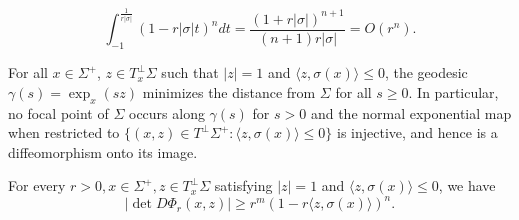 \documentclass[10pt,a4paper]{amsart}
\begin{document}
\begin{equation}\label{ineq I+4}
\int_{-1}^{\frac{1}{r|\sigma|}}(1-r|\sigma| t)^n d t=
\frac{(1+r|\sigma|)^{n+1}}{(n+1) r|\sigma|}=O(r^n).
\end{equation}

\begin{lemma}\label{lem no focal}
For all $x \in \Sigma^+$, $z \in {T}_x^{\perp} \Sigma$ such that $|z|=1$ and $\langle z, \sigma(x)\rangle \le 0$,
the geodesic $\gamma(s)=\exp_x\left(sz\right)$ minimizes the distance from $\Sigma$ for all $s \ge0$. In particular, no focal point of $\Sigma$ occurs along $\gamma(s)$ for $s>0$ and the normal exponential map when restricted to $\{(x, z)\in T^\perp \Sigma^+: \langle z, \sigma(x)\rangle \le 0\}$ is injective, and hence is a diffeomorphism onto its image.
\end{lemma}

\begin{lemma}\label{lem xyt=1}
For every $r>0, x \in \Sigma^+, z \in {T}_x^{\perp} \Sigma$ satisfying $|z|=1$ and $\langle z, \sigma(x)\rangle \le0$, we have
$$
\left|\det D \Phi_r(x, z)\right| \ge r^m\left(1-r\langle z, \sigma(x) \rangle \right)^n.
$$
\end{lemma}
\end{document}
